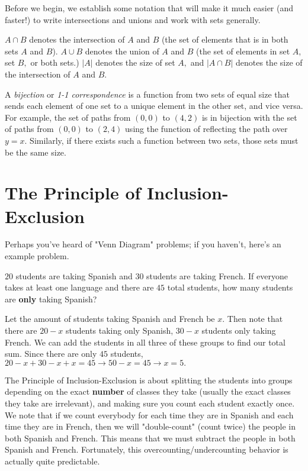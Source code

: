 Before we begin, we establish some notation that will make it much easier (and faster!) to write intersections and unions and work with sets generally.

$A\cap B$ denotes the intersection of $A$ and $B$ (the set of elements that is in both sets $A$ and $B$). $A\cup B$ denotes the union of $A$ and $B$ (the set of elements in set $A,$ set $B,$ or both sets.) $|A|$ denotes the size of set $A,$ and $|A\cap B|$ denotes the size of the intersection of $A$ and $B.$

A \emph{bijection} or \emph{1-1 correspondence} is a function from two sets of equal size that sends each element of one set to a unique element in the other set, and vice versa. For example, the set of paths from $(0,0)$ to $(4,2)$ is in bijection with the set of paths from $(0,0)$ to $(2,4)$ using the function of reflecting the path over $y = x$. Similarly, if there exists such a function between two sets, those sets must be the same size.

\section{The Principle of Inclusion-Exclusion}

Perhaps you've heard of "Venn Diagram" problems; if you haven't, here's an example problem.

\begin{exam}
$20$ students are taking Spanish and $30$ students are taking French. If everyone takes at least one language and there are $45$ total students, how many students are \textbf{only} taking Spanish?
\end{exam}

\begin{sol}
Let the amount of students taking Spanish and French be $x.$ Then note that there are $20-x$ students taking only Spanish, $30-x$ students only taking French. We can add the students in all three of these groups to find our total sum. Since there are only $45$ students, $20-x+30-x+x=45\to 50-x=45\to x=5.$
\end{sol}

The Principle of Inclusion-Exclusion is about splitting the students into groups depending on the exact \textbf{number} of classes they take (usually the exact classes they take are irrelevant), and making sure you count each student exactly once. We note that if we count everybody for each time they are in Spanish and each time they are in French, then we will "double-count" (count twice) the people in both Spanish and French. This means that we must subtract the people in both Spanish and French. Fortunately, this overcounting/undercounting behavior is actually quite predictable.

